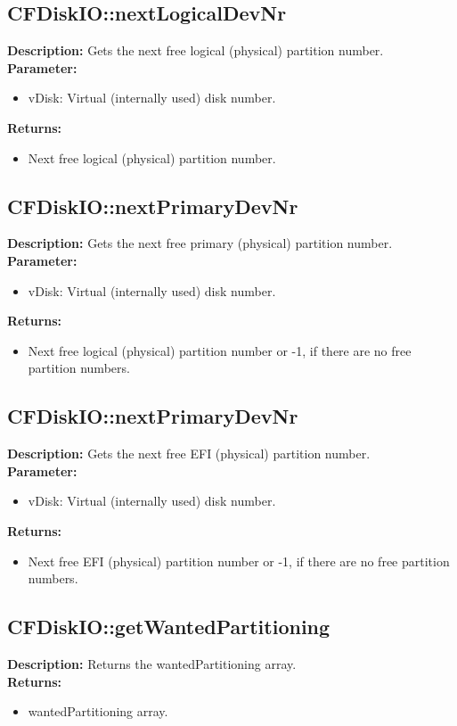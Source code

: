 \subsection{CFDiskIO::nextLogicalDevNr}
\textbf{Description:} Gets the next free logical (physical) partition number.\\
\textbf{Parameter:}
\begin{itemize}
\item vDisk: Virtual (internally used) disk number.
\end{itemize}
\textbf{Returns:}
\begin{itemize}
\item Next free logical (physical) partition number.
\end{itemize}

\subsection{CFDiskIO::nextPrimaryDevNr}
\textbf{Description:} Gets the next free primary (physical) partition number.\\
\textbf{Parameter:}
\begin{itemize}
\item vDisk: Virtual (internally used) disk number.
\end{itemize}
\textbf{Returns:}
\begin{itemize}
\item Next free logical (physical) partition number or -1, if there are no free partition numbers.
\end{itemize}

\subsection{CFDiskIO::nextPrimaryDevNr}
\textbf{Description:} Gets the next free EFI (physical) partition number.\\
\textbf{Parameter:}
\begin{itemize}
\item vDisk: Virtual (internally used) disk number.
\end{itemize}
\textbf{Returns:}
\begin{itemize}
\item Next free EFI (physical) partition number or -1, if there are no free partition numbers.
\end{itemize}

\subsection{CFDiskIO::getWantedPartitioning}
\textbf{Description:} Returns the wantedPartitioning array.\\
\textbf{Returns:}
\begin{itemize}
\item wantedPartitioning array.
\end{itemize}


